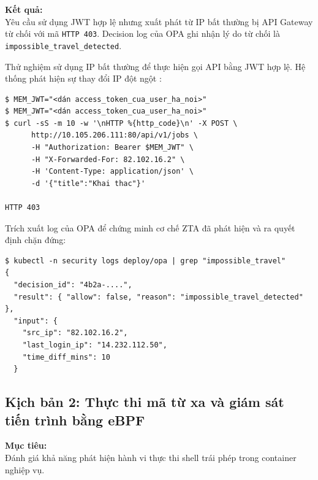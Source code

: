 \textbf{Kết quả:}\\
Yêu cầu sử dụng JWT hợp lệ nhưng xuất phát từ IP bất thường bị API Gateway từ chối với mã \texttt{HTTP 403}. Decision log của OPA ghi nhận lý do từ chối là \texttt{impossible_travel_detected}.


Thử nghiệm sử dụng IP bất thường  để thực hiện gọi API bằng JWT hợp lệ. Hệ thống phát hiện sự thay đổi IP đột ngột :
\begin{listing}[H]
\begin{verbatim}
$ MEM_JWT="<dán access_token_cua_user_ha_noi>"
$ MEM_JWT="<dán access_token_cua_user_ha_noi>"
$ curl -sS -m 10 -w '\nHTTP %{http_code}\n' -X POST \
      http://10.105.206.111:80/api/v1/jobs \
      -H "Authorization: Bearer $MEM_JWT" \
      -H "X-Forwarded-For: 82.102.16.2" \
      -H 'Content-Type: application/json' \
      -d '{"title":"Khai thac"}'

HTTP 403
\end{verbatim}
\caption{Mô phỏng chuyển vùng và giả lập request bị API Gateway chặn lại}
\label{lst:kb1_attack_req}
\end{listing}

Trích xuất log của OPA để chứng minh cơ chế ZTA đã phát hiện và ra quyết định chặn đứng:
\begin{listing}[H]
\caption{Ví dụ log quyết định (decision log) mong đợi của OPA khi giả lập IP chuyển vùng}
\label{lst:kb1_opa_log_cmd}
\begin{verbatim}
$ kubectl -n security logs deploy/opa | grep "impossible_travel"
{
  "decision_id": "4b2a-....",
  "result": { "allow": false, "reason": "impossible_travel_detected" },
  "input": {
    "src_ip": "82.102.16.2",
    "last_login_ip": "14.232.112.50",
    "time_diff_mins": 10
  }
\end{verbatim}
\end{listing}

\subsection{Kịch bản 2: Thực thi mã từ xa và giám sát tiến trình bằng eBPF}
\label{subsec:kb2_rce_ebpf}

\textbf{Mục tiêu:}\\
Đánh giá khả năng phát hiện hành vi thực thi shell trái phép trong container nghiệp vụ.

